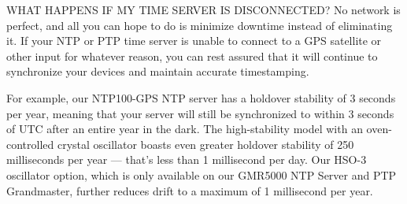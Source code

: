 \documentclass[a4paper,12pt, master]{etf}
\begin{document}
	WHAT HAPPENS IF MY TIME SERVER IS DISCONNECTED?
	No network is perfect, and all you can hope to do is minimize downtime instead of 
	eliminating it. If your NTP or PTP time server is unable to connect to a GPS satellite or 
	other input for whatever reason, you can rest assured that it will continue to 
	synchronize your devices and maintain accurate timestamping.

	For example, our NTP100-GPS NTP server has a holdover stability of 3 seconds per year, 
	meaning that your server will still be synchronized to within 3 seconds of UTC after an 
	entire year in the dark. The high-stability model with an oven-controlled crystal 
	oscillator boasts even greater holdover stability of 250 milliseconds per year — that's 
	less than 1 millisecond per day. Our HSO-3 oscillator option, which is only available on 
	our GMR5000 NTP Server and PTP Grandmaster, further reduces drift to a maximum of 1 
	millisecond per year. 

	\newpage
\end{document}

